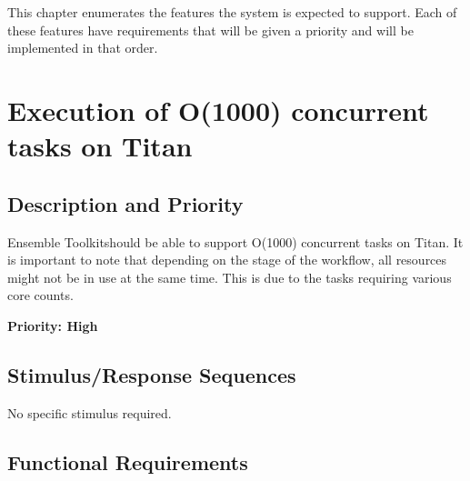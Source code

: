 \documentclass{scrreprt}
\def\entk{Ensemble Toolkit}
\begin{document}
This chapter enumerates the features the system is expected to support. Each of these features have requirements that will be given a priority and will be implemented in that order. 

\section{Execution of O(1000) concurrent tasks on Titan}

\subsection{Description and Priority}

\entk should be able to support O(1000) concurrent tasks on Titan. It is important to note that depending on the stage of the workflow, all resources might not be in use at the same time. This is due to the tasks requiring various core counts.

\textbf{Priority: High}

\subsection{Stimulus/Response Sequences}

No specific stimulus required.

\subsection{Functional Requirements}
\end{document}
